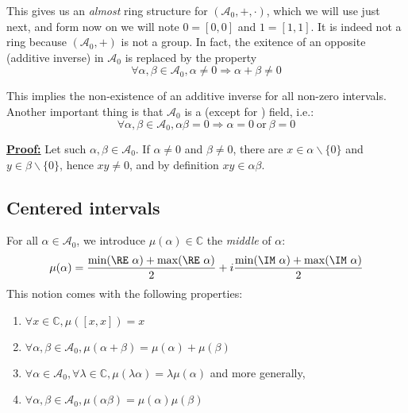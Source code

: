 This gives us an \textit{almost} ring structure for $(\mathcal{A}_0, +, \cdot)$, which we will use just next, and form now on we will note $0 = [0, 0]$ and $1 = [1, 1]$. It is indeed not a ring because $(\mathcal{A}_0, +)$ is not a group. In fact, the exitence of an opposite (additive inverse) in $\mathcal{A}_0$ is replaced by the property
$$\forall \alpha,\beta \in \mathcal{A}_0, \alpha \not= 0 \Rightarrow \alpha + \beta \not= 0$$

This implies the non-existence of an additive inverse for all non-zero intervals. Another important thing is that $\mathcal{A}_0$ is a (except for ) field, i.e.:
$$\forall \alpha, \beta \in \mathcal{A}_0, \alpha \beta = 0 \Rightarrow \alpha = 0 ~\text{or}~ \beta = 0$$

\noindent\underline{\textbf{Proof:}} Let such $\alpha, \beta \in \mathcal{A}_0$.
If $\alpha \not= 0$ and $\beta \not= 0$, there are $x \in \alpha \backslash \{0\}$ and $y \in \beta \backslash \{0\}$, hence $xy \not= 0$, and by definition $xy \in \alpha\beta$.
\hfill{} $\boxed{}$

\subsection{Centered intervals}

For all $\alpha \in \mathcal{A}_0$, we introduce $\mu(\alpha) \in \mathbb{C}$ the \textit{middle} of $\alpha$:
$$\mu(\alpha) = \frac{\min(\RE~\alpha) + \max(\RE~\alpha)}{2} + i \frac{\min(\IM~\alpha) + \max(\IM~\alpha)}{2}$$
This notion comes with the following properties:
\begin{enumerate}[i]
    \item $\forall x \in \mathbb{C}, \mu([x, x]) = x$
    \item\label{musum} $\forall \alpha, \beta \in \mathcal{A}_0, \mu(\alpha + \beta) = \mu(\alpha) + \mu(\beta)$
    \item \label{muscalarprod}$\forall \alpha \in \mathcal{A}_0, \forall \lambda \in \mathbb{C}, \mu(\lambda \alpha) = \lambda \mu(\alpha)$ and more generally,
    \item $\forall \alpha, \beta \in \mathcal{A}_0, \mu(\alpha \beta) = \mu(\alpha) \mu(\beta)$
\end{enumerate}

